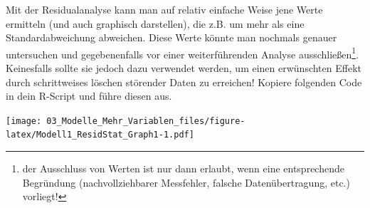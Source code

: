 \documentclass[]{article}
\newenvironment{Shaded}{\begin{snugshade}}{\end{snugshade}}
\newcommand{\KeywordTok}[1]{\textcolor[rgb]{0.13,0.29,0.53}{\textbf{#1}}}
\newcommand{\DataTypeTok}[1]{\textcolor[rgb]{0.13,0.29,0.53}{#1}}
\newcommand{\DecValTok}[1]{\textcolor[rgb]{0.00,0.00,0.81}{#1}}
\newcommand{\StringTok}[1]{\textcolor[rgb]{0.31,0.60,0.02}{#1}}
\newcommand{\CommentTok}[1]{\textcolor[rgb]{0.56,0.35,0.01}{\textit{#1}}}
\newcommand{\OtherTok}[1]{\textcolor[rgb]{0.56,0.35,0.01}{#1}}
\newcommand{\OperatorTok}[1]{\textcolor[rgb]{0.81,0.36,0.00}{\textbf{#1}}}
\newcommand{\NormalTok}[1]{#1}
\let\rmarkdownfootnote\footnote%
\def\footnote{\protect\rmarkdownfootnote}
\begin{document}
Mit der Residualanalyse kann man auf relativ einfache Weise jene Werte
ermitteln (und auch graphisch darstellen), die z.B. um mehr als eine
Standardabweichung abweichen. Diese Werte könnte man nochmals genauer
untersuchen und gegebenenfalls vor einer weiterführenden Analyse
ausschließen\footnote{der Ausschluss von Werten ist nur dann erlaubt,
  wenn eine entsprechende Begründung (nachvollziehbarer Messfehler,
  falsche Datenübertragung, etc.) vorliegt!}. Keinesfalls sollte sie
jedoch dazu verwendet werden, um einen erwünschten Effekt durch
schrittweises löschen störender Daten zu erreichen! Kopiere folgenden
Code in dein R-Script und führe diesen aus.

\begin{Shaded}
\end{Shaded}

\texttt{[image: 03\_Modelle\_Mehr\_Variablen\_files/figure-latex/Modell1\_ResidStat\_Graph1-1.pdf]}
\end{document}
